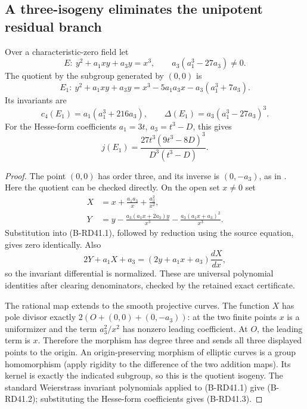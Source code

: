 \subsection{A three-isogeny eliminates the unipotent residual branch}

\begin{lemma}
\label{lem:B-RD41-isogeny}
Over a characteristic-zero field let
\[
 E:\ y^2+a_1xy+a_3y=x^3,\qquad a_3(a_1^3-27a_3)\ne0.
\]
The quotient by the subgroup generated by $(0,0)$ is
\[
 E_1:\ y^2+a_1xy+a_3y
       =x^3-5a_1a_3x-a_3(a_1^3+7a_3).
                                                        \tag{B-RD41.1}
\]
Its invariants are
\[
 c_4(E_1)=a_1(a_1^3+216a_3),\qquad
 \Delta(E_1)=a_3(a_1^3-27a_3)^3.
                                                        \tag{B-RD41.2}
\]
For the Hesse-form coefficients $a_1=3t$, $a_3=t^3-D$, this gives
\[
          j(E_1)=\frac{27t^3(9t^3-8D)^3}{D^3(t^3-D)}.
                                                        \tag{B-RD41.3}
\]
\end{lemma}
\begin{proof}
The point $(0,0)$ has order three, and its inverse is $(0,-a_3)$,
as in \citet[Lemma~4.1, p.~8]{Fisher2015Nine}. Here the quotient
can be checked directly. On the open set $x\ne0$ set
\[
\begin{split}
 X&=x+\frac{a_1a_3}{x}+\frac{a_3^2}{x^2},\\
 Y&=y-\frac{a_3(a_1x+2a_3)y}{x^3}
        -\frac{a_3(a_1x+a_3)^2}{x^3}.
\end{split}                                             \tag{B-RD41.4}
\]
Substitution into (B-RD41.1), followed by reduction using the source
equation, gives zero identically. Also
\[
          2Y+a_1X+a_3=(2y+a_1x+a_3)\frac{dX}{dx},
\]
so the invariant differential is normalized. These are universal
polynomial identities after clearing denominators, checked by the
retained exact certificate.

The rational map extends to the smooth projective curves. The
function $X$ has pole divisor exactly
$2(O+(0,0)+(0,-a_3))$: at the two finite points $x$ is a uniformizer
and the term $a_3^2/x^2$ has nonzero leading coefficient. At $O$,
the leading term is $x$. Therefore the morphism has degree three
and sends all three displayed points to the origin. An origin-preserving
morphism of elliptic curves is a group homomorphism (apply rigidity
to the difference of the two addition maps). Its kernel is exactly
the indicated subgroup, so this is the quotient isogeny.
The standard Weierstrass invariant polynomials applied to
(B-RD41.1) give (B-RD41.2); substituting the Hesse-form coefficients
gives (B-RD41.3).
\end{proof}

